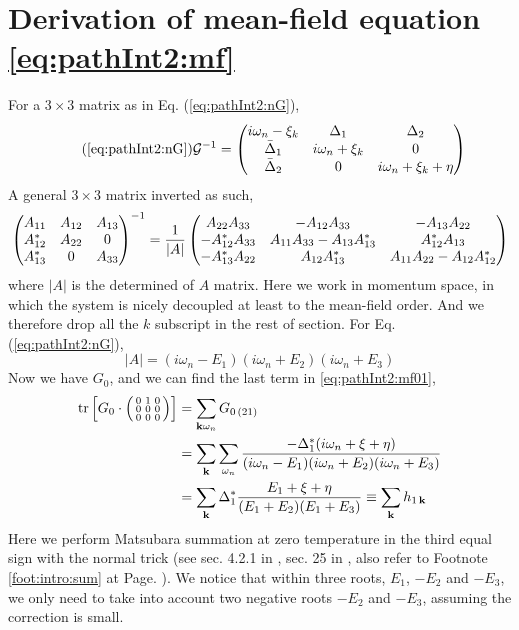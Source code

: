 \section{Derivation of  mean-field equation \eqref{eq:pathInt2:mf}\label{sec:pathInt2:deriveMF}}
For a $3\times3$ matrix as in Eq. (\ref{eq:pathInt2:nG}), 
\begin{equation}\tag{\ref{eq:pathInt2:nG}}
\mathcal{G}^{-1}=\begin{pmatrix}
i\omega_{n}-\xi_{k}&\Delta_{1}&\Delta_{2}\\
\bar{\Delta}_{1}&i\omega_{n}+\xi_{k}&0\\
\bar{\Delta}_{2}&0&i\omega_{n}+\xi_{k}+\eta
\end{pmatrix}
\end{equation}
A general $3\times3$ matrix inverted as such, 
  \begin{equation}
  \begin{pmatrix}A_{11}&A_{12}&A_{13}\\A_{12}^{*}&A_{22}&0\\A_{13}^{*}&0&A_{33}\end{pmatrix}^{-1}=
  \frac{1}{|A|}
  \begin{pmatrix}A_{22}A_{33}&-A_{12}A_{33}&-A_{13}A_{22}\\
  	-A_{12}^{*}A_{33}&A_{11}A_{33}-A_{13}A_{13}^{*}&A_{12}^{*}A_{13}\\
	-A_{13}^{*}A_{22}&A_{12}A_{13}^{*}&A_{11}A_{22}-A_{12}A_{12}^{*}\end{pmatrix}
  \end{equation}
where $|A|$ is the determined of $A$ matrix.  Here we work in momentum space, in which the system is nicely decoupled at least to the mean-field order.  And we therefore drop all the $k$ subscript in the rest of section.  For Eq. (\ref{eq:pathInt2:nG}),
\begin{equation}
|A|=(i\omega_{n}-E_{1})(i\omega_{n}+E_{2})(i\omega_{n}+E_{3})
\end{equation}
Now we have $G_{0}$, and we can find the last term in \ref{eq:pathInt2:mf01}, 
\begin{equation}
\begin{split}
\text{tr}\left[{G_{0}}\cdot\left(\begin{smallmatrix}0&1&0\\0&0&0\\0&0&0\end{smallmatrix}\right)\right]&=\sum_{\mathbf{k}\omega_{n}}G_{0\,(21)}\\
&=\sum_{\mathbf{k}}\sum_{\omega_{n}}\frac{-\Delta_{1}^{*}(i\omega_{n}+\xi+\eta)}{(i\omega_{n}-E_{1})(i\omega_{n}+E_{2})(i\omega_{n}+E_{3})}\\
&=\sum_{\mathbf{k}}\Delta_{1}^{*}\frac{E_{1}+\xi+\eta}{(E_{1}+E_{2})(E_{1}+E_{3})}\equiv\sum_{\mathbf{k}}h_{1\,\mathbf{k}}
\end{split}
\end{equation}
Here we perform Matsubara summation at zero temperature in the third equal sign with the normal trick (see sec. 4.2.1 in \cite{Altland}, sec. 25 in \cite{Fetter}, also refer to Footnote \ref{foot:intro:sum} at Page. \pageref{foot:intro:sum}).  We notice that within three roots, $E_{1}$, $-E_{2}$ and $-E_{3}$, we only need to take into account two negative roots $-E_{2}$ and $-E_{3}$, assuming the correction is small. 
